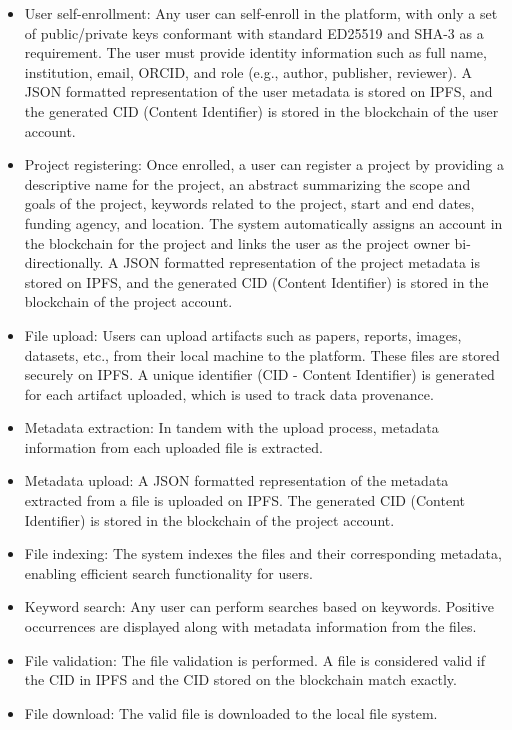 \documentclass{article}
\begin{document}
\begin{itemize}
    \item User self-enrollment:
          \indent Any user can self-enroll in the platform, with only a set of public/private keys conformant with standard ED25519 and SHA-3 as a requirement. The user must provide identity information such as full name, institution, email, ORCID, and role (e.g., author, publisher, reviewer). A JSON formatted representation of the user metadata is stored on IPFS, and the generated CID (Content Identifier) is stored in the blockchain of the user account.

    \item Project registering:
          \indent Once enrolled, a user can register a project by providing a descriptive name for the project, an abstract summarizing the scope and goals of the project, keywords related to the project, start and end dates, funding agency, and location. The system automatically assigns an account in the blockchain for the project and links the user as the project owner bi-directionally. A JSON formatted representation of the project metadata is stored on IPFS, and the generated CID (Content Identifier) is stored in the blockchain of the project account.

    \item File upload:
          \indent Users can upload artifacts such as papers, reports, images, datasets, etc., from their local machine to the platform. These files are stored securely on IPFS. A unique identifier (CID - Content Identifier) is generated for each artifact uploaded, which is used to track data provenance.

    \item Metadata extraction:
          \indent In tandem with the upload process, metadata information from each uploaded file is extracted.

    \item Metadata upload:
          \indent A JSON formatted representation of the metadata extracted from a file is uploaded on IPFS. The generated CID (Content Identifier) is stored in the blockchain of the project account.

    \item File indexing:
          \indent The system indexes the files and their corresponding metadata, enabling efficient search functionality for users.

    \item Keyword search:
          \indent Any user can perform searches based on keywords. Positive occurrences are displayed along with metadata information from the files.

    \item File validation:
          \indent The file validation is performed. A file is considered valid if the CID in IPFS and the CID stored on the blockchain match exactly.

    \item File download:
          \indent The valid file is downloaded to the local file system.
\end{itemize}
\end{document}
